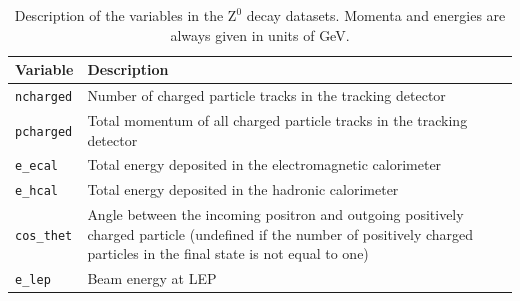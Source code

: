 \documentclass[11pt, a4paper]{article}
\numberwithin{equation}{section}
\begin{document}
\begin{table}[H]
	\centering
	\begin{tabularx}{0.9\textwidth}{lX}
		\toprule
		\textbf{Variable} & \textbf{Description} \\
		\midrule		
		\texttt{ncharged} & Number of charged particle tracks in the tracking detector \\
		\texttt{pcharged} & Total momentum of all charged particle tracks in the tracking detector \\
		\texttt{e\_ecal} & Total energy deposited in the electromagnetic calorimeter \\
		\texttt{e\_hcal} & Total energy deposited in the hadronic calorimeter \\
		\texttt{cos\_thet} & Angle between the incoming positron and outgoing positively charged particle (undefined if the number of positively charged particles in the final state is not equal to one) \\
		\texttt{e\_lep} & Beam energy at LEP \\
		\bottomrule
	\end{tabularx}
	\caption{Description of the variables in the $\mathrm{Z}^0$ decay datasets. Momenta and energies are always given in units of GeV.}
	\label{tab:desc_variables}
\end{table}
\end{document}
